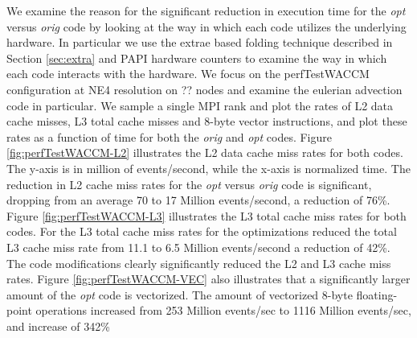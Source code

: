 We examine the reason for the significant reduction in execution time for the {\em opt} versus {\em orig} code by looking at the way in which each code utilizes the underlying hardware.  In particular we use the extrae based folding technique described in Section \ref{sec:extra} and PAPI hardware counters \cite{papi} to examine the way in which each code interacts with the hardware.  We focus on the perfTestWACCM configuration at NE4 resolution on ?? nodes and examine the eulerian advection code in particular.  We sample a single MPI rank and plot the rates of L2 data cache misses, L3 total cache misses and 8-byte vector instructions, and plot these rates as a function of time for both the {\em orig} and {\em opt} codes.  Figure \ref{fig:perfTestWACCM-L2} illustrates the L2 data cache miss rates for both codes. The y-axis is in million of events/second, while the x-axis is normalized time.  The reduction in L2 cache miss rates for the {\em opt} versus {\em orig} code is significant, dropping from an average 70 to 17 Million events/second, a reduction of 76\%.  Figure \ref{fig:perfTestWACCM-L3} illustrates the L3 total cache miss rates for both codes.  For the L3 total cache miss rates for the optimizations reduced the total L3 cache miss rate from 11.1 to 6.5 Million events/second a reduction of 42\%.  The code modifications clearly significantly reduced the L2 and L3 cache miss rates.  Figure \ref{fig:perfTestWACCM-VEC} also illustrates that a significantly larger amount of the {\em opt} code is vectorized.  The amount of vectorized 8-byte floating-point operations increased from 253 Million events/sec to 1116 Million events/sec, and increase of 342\%

